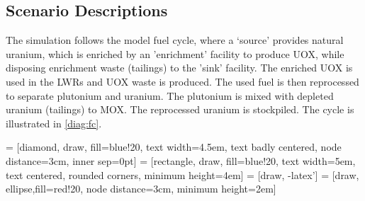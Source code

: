 \subsection{Scenario Descriptions}
The simulation follows the model fuel cycle, where a `source'
provides natural uranium, which is enriched by an 'enrichment'
facility to produce \gls{UOX}, while disposing enrichment waste (tailings)
to the 'sink' facility. The enriched \gls{UOX} is used
in the \gls{LWR}s and \gls{UOX} waste is produced. The used fuel
is then reprocessed to separate plutonium and uranium.
The plutonium is mixed with depleted uranium (tailings) to \gls{MOX}.
The reprocessed uranium is stockpiled. The cycle is illustrated in
\cref{diag:fc}.


 = [diamond, draw, fill=blue!20, 
text width=4.5em, text badly centered, node distance=3cm, inner sep=0pt]
 = [rectangle, draw, fill=blue!20, 
text width=5em, text centered, rounded corners, minimum height=4em]
 = [draw, -latex']
 = [draw, ellipse,fill=red!20, node distance=3cm,
minimum height=2em]


